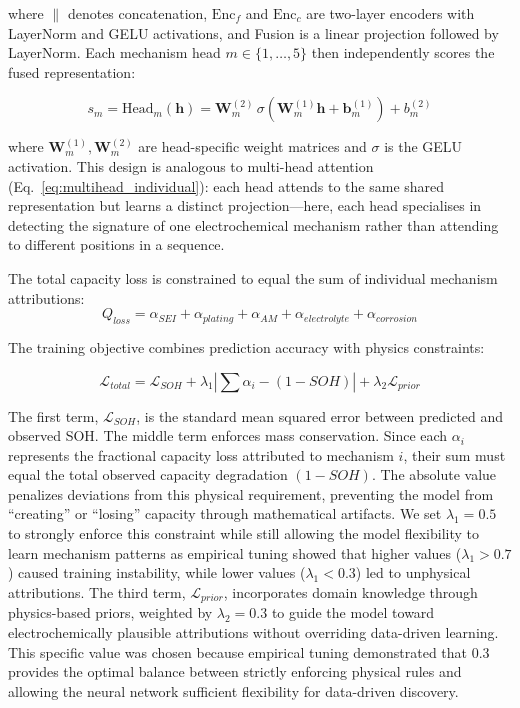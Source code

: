 \documentclass[5p,times,authoryear]{elsarticle}
\begin{document}
where $\|$ denotes concatenation, $\text{Enc}_f$ and $\text{Enc}_c$ are two-layer encoders with LayerNorm and GELU activations, and Fusion is a linear projection followed by LayerNorm. Each mechanism head $m \in \{1,\ldots,5\}$ then independently scores the fused representation:

\begin{equation}
s_m = \text{Head}_m(\mathbf{h}) = \mathbf{W}_m^{(2)} \,\sigma\!\left(\mathbf{W}_m^{(1)} \mathbf{h} + \mathbf{b}_m^{(1)}\right) + b_m^{(2)}
\label{eq:mechanism_heads}
\end{equation}

where $\mathbf{W}_m^{(1)}, \mathbf{W}_m^{(2)}$ are head-specific weight matrices and $\sigma$ is the GELU activation. This design is analogous to multi-head attention (Eq.~\ref{eq:multihead_individual}): each head attends to the same shared representation but learns a distinct projection---here, each head specialises in detecting the signature of one electrochemical mechanism rather than attending to different positions in a sequence.

The total capacity loss is constrained to equal the sum of individual mechanism attributions:
\begin{equation}
Q_{loss} = \alpha_{SEI} + \alpha_{plating} + \alpha_{AM} + \alpha_{electrolyte} + \alpha_{corrosion}
\end{equation}

The training objective combines prediction accuracy with physics constraints:

\begin{equation}
\mathcal{L}_{total} = \mathcal{L}_{SOH} + \lambda_1 \left| \sum \alpha_i - (1 - SOH) \right| + \lambda_2 \mathcal{L}_{prior}
\end{equation}

The first term, $\mathcal{L}_{SOH}$, is the standard mean squared error between predicted and observed SOH. The middle term enforces mass conservation. Since each $\alpha_i$ represents the fractional capacity loss attributed to mechanism $i$, their sum must equal the total observed capacity degradation $(1 - SOH)$. The absolute value penalizes deviations from this physical requirement, preventing the model from ``creating'' or ``losing'' capacity through mathematical artifacts. We set $\lambda_1 = 0.5$ to strongly enforce this constraint while still allowing the model flexibility to learn mechanism patterns as empirical tuning showed that higher values ($\lambda_1 > 0.7$) caused training instability, while lower values ($\lambda_1 < 0.3$) led to unphysical attributions. The third term, $\mathcal{L}_{prior}$, incorporates domain knowledge through physics-based priors, weighted by $\lambda_2 = 0.3$ to guide the model toward electrochemically plausible attributions without overriding data-driven learning. This specific value was chosen because empirical tuning demonstrated that 0.3 provides the optimal balance between strictly enforcing physical rules and allowing the neural network sufficient flexibility for data-driven discovery.
\end{document}
